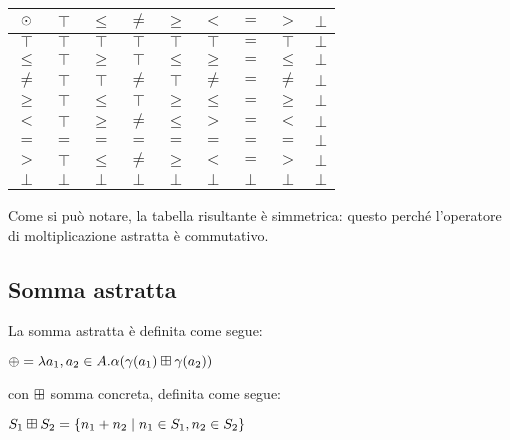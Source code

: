 \begin{center}
	\begin{tabular}{| c | c | c | c | c | c | c | c | c | }
		\hline
		$\mathbin{\odot}$ & $\top$ & $\leq$ & $\neq$ & $\geq$ & $<$ & $=$ & $>$ & $\bot$ \\
		\hline
		$\top$ & $\top$ & $\top$ & $\top$ & $\top$ & $\top$ & $=$ & $\top$ & $\bot$  \\
		\hline
		$\leq$ & $\top$ & $\geq$ & $\top$ & $\leq$ & $\geq$ & $=$ & $\leq$ & $\bot$\\
		\hline
		$\neq$ & $\top$ & $\top$ & $\neq$ & $\top$ & $\neq$ & $=$ & $\neq$ & $\bot$ \\
		\hline
		$\geq$ & $\top$ & $\leq$ & $\top$ & $\geq$ & $\leq$ & $=$ & $\geq$ & $\bot$ \\
		\hline
		$<$ & $\top$ & $\geq$ & $\neq$ & $\leq$ & $>$ & $=$ & $<$ & $\bot$ \\
		\hline
		$=$ & $=$ & $=$ & $=$ & $=$ & $=$ & $=$ & $=$ & $\bot$\\
		\hline
		$>$ & $\top$ & $\leq$ & $\neq$ & $\geq$ & $<$ & $=$ & $>$ & $\bot$\\
		\hline
		$\bot$ & $\bot$ & $\bot$ & $\bot$ & $\bot$ & $\bot$ & $\bot$ & $\bot$ & $\bot$ \\
		\hline
	\end{tabular}
\end{center}

Come si può notare, la tabella risultante è simmetrica: questo perché l'operatore di moltiplicazione astratta è commutativo.

\subsection{Somma astratta}

La somma astratta è definita come segue:

\begin{center}
	$ \mathbin{\oplus} = \lambda a_1,a_2 \in A . \alpha(\gamma(a_1) \mathbin{\boxplus} \gamma(a_2)) $
\end{center}
con $\mathbin{\boxplus}$ somma concreta, definita come segue:

\begin{center}
	$ S_1 \mathbin{\boxplus} S_2 = \{ n_1 + n_2 \mid n_1 \in S_1, n_2 \in S_2 \} $
\end{center}

